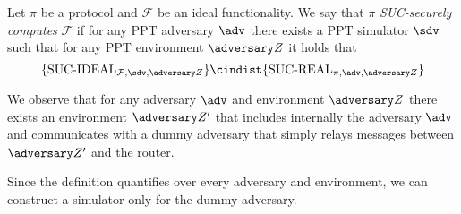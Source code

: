 \begin{definition}
    Let $\pi$ be a protocol and $\mathcal F$ be an ideal functionality. We say that $\pi$ \emph{SUC-securely computes} $\mathcal F$ if for any PPT adversary $\adv$ there exists a PPT simulator $\sdv$ such that for any PPT environment $\zdv$ it holds that
    $$ \{ \text{SUC-IDEAL}_{\Fun, \sdv, \zdv} \} \cindist \{ \text{SUC-REAL}_{\pi, \adv, \zdv} \}$$
\end{definition}

We observe that for any adversary $\adv$ and environment $\zdv$ there exists an environment $\zdv'$ that includes internally the adversary $\adv$ and communicates with a dummy adversary that simply relays messages between $\zdv'$ and the router.

Since the definition quantifies over every adversary and environment, we can construct a simulator only for the dummy adversary.
